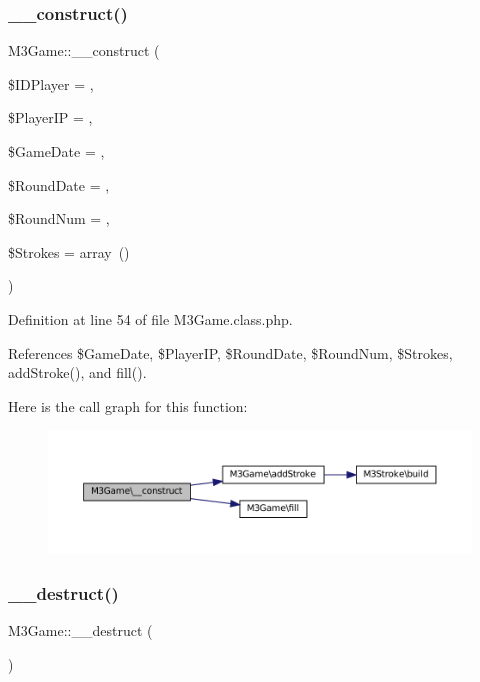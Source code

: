 \subsubsection{\texorpdfstring{\+\_\+\+\_\+construct()}{\_\_construct()}}
{\footnotesize\ttfamily M3\+Game\+::\+\_\+\+\_\+construct (\begin{DoxyParamCaption}\item[{}]{\$\+I\+D\+Player = {\ttfamily \textquotesingle{}\textquotesingle{}},  }\item[{}]{\$\+Player\+IP = {\ttfamily \textquotesingle{}\textquotesingle{}},  }\item[{}]{\$\+Game\+Date = {},  }\item[{}]{\$\+Round\+Date = {},  }\item[{}]{\$\+Round\+Num = {},  }\item[{}]{\$\+Strokes = {\ttfamily array~()} }\end{DoxyParamCaption})}



Definition at line 54 of file M3\+Game.\+class.\+php.



References \$\+Game\+Date, \$\+Player\+IP, \$\+Round\+Date, \$\+Round\+Num, \$\+Strokes, add\+Stroke(), and fill().

Here is the call graph for this function\+:\nopagebreak
\begin{figure}[H]
\begin{center}
\leavevmode
\includegraphics[width=350pt]{class_m3_game_a0a95aa60413fd78db8b25f2ff6b0e885_cgraph}
\end{center}
\end{figure}
\mbox{\label{class_m3_game_a40cac41918003792e3387919fa6259ad}} 
\subsubsection{\texorpdfstring{\+\_\+\+\_\+destruct()}{\_\_destruct()}}
{\footnotesize\ttfamily M3\+Game\+::\+\_\+\+\_\+destruct (\begin{DoxyParamCaption}{ }\end{DoxyParamCaption})}



